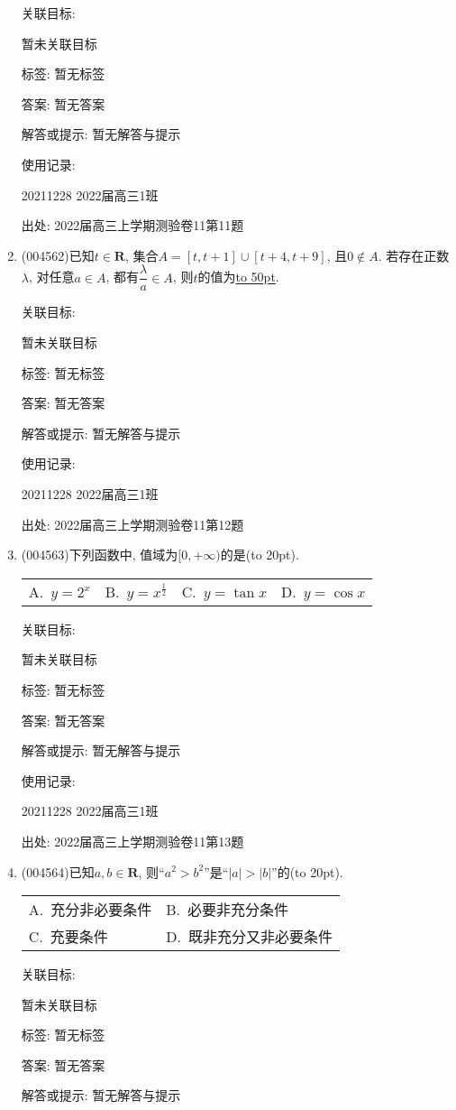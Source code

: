 \documentclass[10pt,a4paper]{article}
\newcommand{\blank}[1]{\underline{\hbox to #1pt{}}}
\newcommand{\bracket}[1]{(\hbox to #1pt{})}
\newcommand{\twoch}[4]{\par\begin{tabular}{p{.46\textwidth}p{.46\textwidth}}
A.~#1& B.~#2\\
C.~#3& D.~#4
\end{tabular}}
\newcommand{\fourch}[4]{\par\begin{tabular}{p{.23\textwidth}p{.23\textwidth}p{.23\textwidth}p{.23\textwidth}}
A.~#1 &B.~#2& C.~#3& D.~#4
\end{tabular}}
\begin{document}
\begin{enumerate}[1.]
关联目标:

暂未关联目标



标签: 暂无标签

答案: 暂无答案

解答或提示: 暂无解答与提示

使用记录:

20211228	2022届高三1班	


出处: 2022届高三上学期测验卷11第11题
\item { (004562)}已知$t\in \mathbf{R}$, 集合$A=[t,t+1]\cup [t+4,t+9]$, 且$0\not\in A$. 若存在正数$\lambda$, 对任意$a\in A$, 都有$\dfrac{\lambda}a\in A$, 则$t$的值为\blank{50}.


关联目标:

暂未关联目标



标签: 暂无标签

答案: 暂无答案

解答或提示: 暂无解答与提示

使用记录:

20211228	2022届高三1班	


出处: 2022届高三上学期测验卷11第12题
\item { (004563)}下列函数中, 值域为$[0,+\infty)$的是\bracket{20}.
\fourch{$y=2^x$}{$y=x^\frac 12$}{$y=\tan x$}{$y=\cos x$}


关联目标:

暂未关联目标



标签: 暂无标签

答案: 暂无答案

解答或提示: 暂无解答与提示

使用记录:

20211228	2022届高三1班	


出处: 2022届高三上学期测验卷11第13题
\item { (004564)}已知$a,b\in\mathbf{R}$, 则``$a^2>b^2$''是``$|a|>|b|$''的\bracket{20}.
\twoch{充分非必要条件}{必要非充分条件}{充要条件}{既非充分又非必要条件}


关联目标:

暂未关联目标



标签: 暂无标签

答案: 暂无答案

解答或提示: 暂无解答与提示


\end{enumerate}
\end{document}
